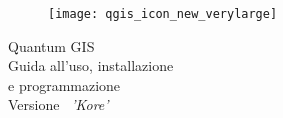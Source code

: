 
\begin{titlepage}
\cleardoublepage
{}
{}
\begin{center}

\begin{figure}[H]
\begin{center}
\texttt{[image: qgis\_icon\_new\_verylarge]} 
\end{center}
\end{figure}

\Huge{Quantum GIS}\\
\vspace{0.5cm}
\Large{Guida all'uso, installazione \\e programmazione} \\
\vspace{0.5cm}
\Large{Versione ~\CURRENT \textsl{'Kore'}}

\end{center}
\end{titlepage}
